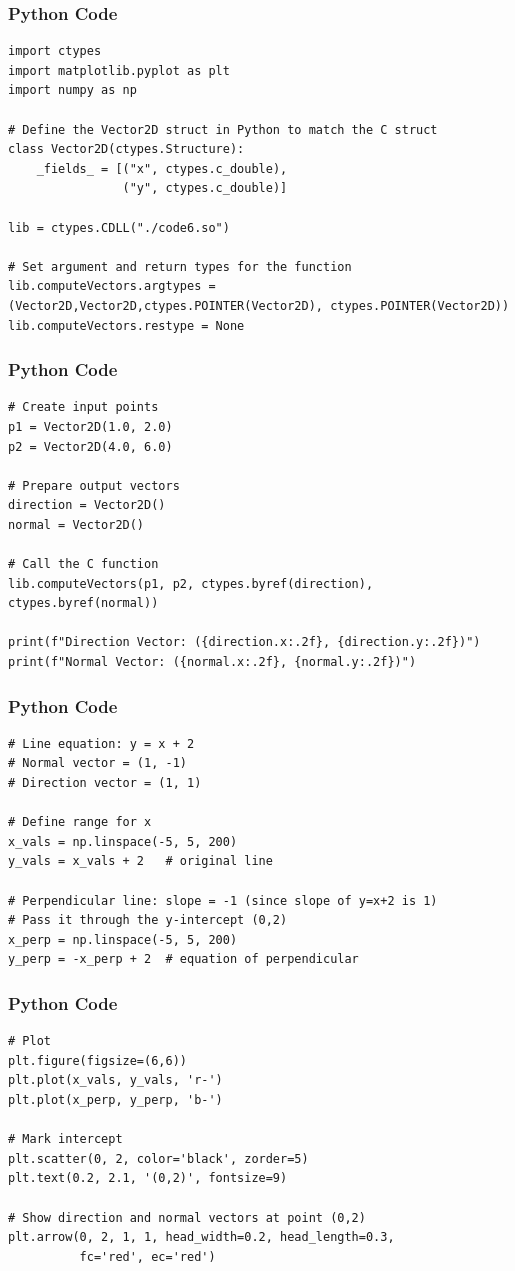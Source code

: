 \documentclass{beamer}
\begin{document}
\begin{frame}[fragile]
\frametitle{Python Code }
\begin{lstlisting}
import ctypes
import matplotlib.pyplot as plt
import numpy as np

# Define the Vector2D struct in Python to match the C struct
class Vector2D(ctypes.Structure):
    _fields_ = [("x", ctypes.c_double),
                ("y", ctypes.c_double)]

lib = ctypes.CDLL("./code6.so")

# Set argument and return types for the function
lib.computeVectors.argtypes = (Vector2D,Vector2D,ctypes.POINTER(Vector2D), ctypes.POINTER(Vector2D))
lib.computeVectors.restype = None

\end{lstlisting}
\end{frame}

\begin{frame}[fragile]
\frametitle{Python Code }
\begin{lstlisting}
# Create input points
p1 = Vector2D(1.0, 2.0)
p2 = Vector2D(4.0, 6.0)

# Prepare output vectors
direction = Vector2D()
normal = Vector2D()

# Call the C function
lib.computeVectors(p1, p2, ctypes.byref(direction), ctypes.byref(normal))

print(f"Direction Vector: ({direction.x:.2f}, {direction.y:.2f})")
print(f"Normal Vector: ({normal.x:.2f}, {normal.y:.2f})")

\end{lstlisting}
\end{frame}

\begin{frame}[fragile]
\frametitle{Python Code }
\begin{lstlisting}
# Line equation: y = x + 2
# Normal vector = (1, -1)
# Direction vector = (1, 1)

# Define range for x
x_vals = np.linspace(-5, 5, 200)
y_vals = x_vals + 2   # original line

# Perpendicular line: slope = -1 (since slope of y=x+2 is 1)
# Pass it through the y-intercept (0,2)
x_perp = np.linspace(-5, 5, 200)
y_perp = -x_perp + 2  # equation of perpendicular

\end{lstlisting}
\end{frame}

\begin{frame}[fragile]
\frametitle{Python Code }
\begin{lstlisting}
# Plot
plt.figure(figsize=(6,6))
plt.plot(x_vals, y_vals, 'r-')
plt.plot(x_perp, y_perp, 'b-')

# Mark intercept
plt.scatter(0, 2, color='black', zorder=5)
plt.text(0.2, 2.1, '(0,2)', fontsize=9)

# Show direction and normal vectors at point (0,2)
plt.arrow(0, 2, 1, 1, head_width=0.2, head_length=0.3, 
          fc='red', ec='red')
\end{lstlisting}
\end{frame}
\end{document}

